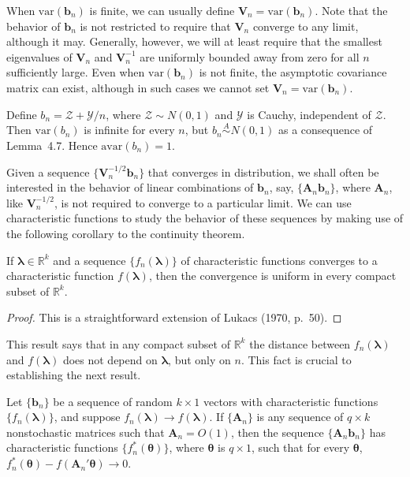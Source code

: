 When $\mathrm{var}(\mathbf{b}_n)$ is finite, we can usually define $\mathbf{V}_n = \mathrm{var}(\mathbf{b}_n)$. Note that
the behavior of $\mathbf{b}_n$ is not restricted to require that $\mathbf{V}_n$ converge to any
limit, although it may. Generally, however, we will at least require that the
smallest eigenvalues of $\mathbf{V}_n$ and $\mathbf{V}_n^{-1}$ are uniformly bounded away from zero
for all $n$ sufficiently large. Even when $\mathrm{var}(\mathbf{b}_n)$ is not finite, the asymptotic
covariance matrix can exist, although in such cases we cannot set $\mathbf{V}_n =
\mathrm{var}(\mathbf{b}_n)$.

\begin{example}\label{ex:4.21}
Define $b_n = \mathcal{Z} + \mathcal{Y}/n$, where $\mathcal{Z} \sim N(0,1)$ and $\mathcal{Y}$ is Cauchy, independent of $\mathcal{Z}$. Then $\mathrm{var}(b_n)$ is infinite for every $n$, but $b_n \overset{A}{\sim} N(0,1)$ as a consequence of Lemma~4.7. Hence $\mathrm{avar}(b_n) = 1$.
\end{example}

Given a sequence $\{\mathbf{V}_n^{-1/2}\mathbf{b}_n\}$ that converges in distribution, we shall often be interested in the behavior of linear combinations of $\mathbf{b}_n$, say, $\{\mathbf{A}_n\mathbf{b}_n\}$,
where $\mathbf{A}_n$, like $\mathbf{V}_n^{-1/2}$, is not required to converge to a particular limit. We
can use characteristic functions to study the behavior of these sequences
by making use of the following corollary to the continuity theorem.

\begin{corollary}\label{cor:4.22}
If $\boldsymbol{\lambda} \in \mathbb{R}^k$ and a sequence $\{f_n(\boldsymbol{\lambda})\}$ of characteristic functions converges to a characteristic function $f(\boldsymbol{\lambda})$, then the convergence is uniform in every compact subset of $\mathbb{R}^k$.
\end{corollary}

\begin{proof}
This is a straightforward extension of Lukacs (1970, p.~50).
\end{proof}

This result says that in any compact subset of $\mathbb{R}^k$ the distance between
$f_n(\boldsymbol{\lambda})$ and $f(\boldsymbol{\lambda})$ does not depend on $\boldsymbol{\lambda}$, but only on $n$. This fact is crucial
to establishing the next result.

\begin{lemma}\label{lem:4.23}
Let $\{\mathbf{b}_n\}$ be a sequence of random $k \times 1$ vectors with characteristic functions $\{f_n(\boldsymbol{\lambda})\}$, and suppose $f_n(\boldsymbol{\lambda}) \to f(\boldsymbol{\lambda})$. If $\{\mathbf{A}_n\}$ is any sequence of $q \times k$ nonstochastic matrices such that $\mathbf{A}_n = O(1)$, then the sequence $\{\mathbf{A}_n\mathbf{b}_n\}$ has characteristic functions $\{f_n^*(\boldsymbol{\theta})\}$, where $\boldsymbol{\theta}$ is $q \times 1$, such that for every $\boldsymbol{\theta}$, $f_n^*(\boldsymbol{\theta}) - f(\mathbf{A}_n'\boldsymbol{\theta}) \to 0$.
\end{lemma}

